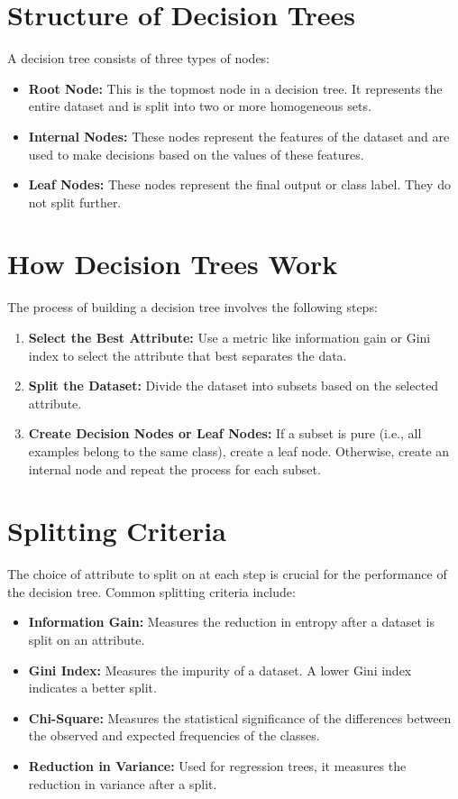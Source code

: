 \documentclass[12pt]{article}
\begin{document}
\section{Structure of Decision Trees}
A decision tree consists of three types of nodes:
\begin{itemize}
    \item \textbf{Root Node:} This is the topmost node in a decision tree. It represents the entire dataset and is split into two or more homogeneous sets.
    \item \textbf{Internal Nodes:} These nodes represent the features of the dataset and are used to make decisions based on the values of these features.
    \item \textbf{Leaf Nodes:} These nodes represent the final output or class label. They do not split further.
\end{itemize}

\section{How Decision Trees Work}
The process of building a decision tree involves the following steps:
\begin{enumerate}
    \item \textbf{Select the Best Attribute:} Use a metric like information gain or Gini index to select the attribute that best separates the data.
    \item \textbf{Split the Dataset:} Divide the dataset into subsets based on the selected attribute.
    \item \textbf{Create Decision Nodes or Leaf Nodes:} If a subset is pure (i.e., all examples belong to the same class), create a leaf node. Otherwise, create an internal node and repeat the process for each subset.
\end{enumerate}

\section{Splitting Criteria}
The choice of attribute to split on at each step is crucial for the performance of the decision tree. Common splitting criteria include:
\begin{itemize}
    \item \textbf{Information Gain:} Measures the reduction in entropy after a dataset is split on an attribute.
    \item \textbf{Gini Index:} Measures the impurity of a dataset. A lower Gini index indicates a better split.
    \item \textbf{Chi-Square:} Measures the statistical significance of the differences between the observed and expected frequencies of the classes.
    \item \textbf{Reduction in Variance:} Used for regression trees, it measures the reduction in variance after a split.
\end{itemize}
\end{document}
